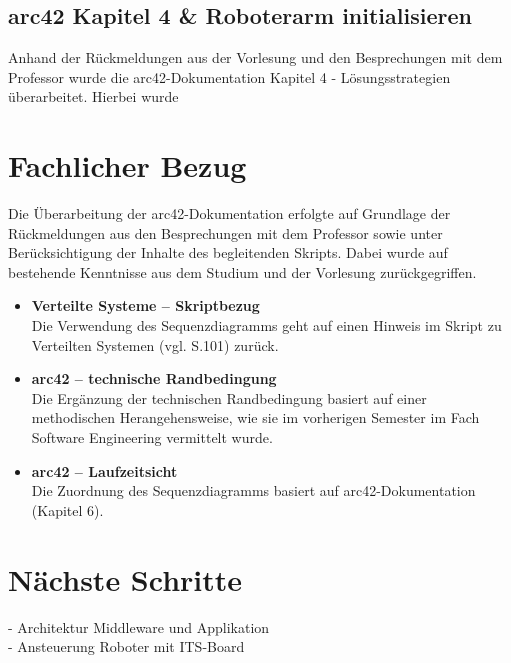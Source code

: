 \documentclass{article}
\begin{document}
\subsection{arc42 Kapitel 4 \& Roboterarm initialisieren} 
Anhand der Rückmeldungen aus der Vorlesung und den Besprechungen mit dem Professor wurde die arc42-Dokumentation Kapitel 4 - Lösungsstrategien überarbeitet.
Hierbei wurde 


\section{Fachlicher Bezug}

Die Überarbeitung der arc42-Dokumentation erfolgte auf Grundlage der Rückmeldungen aus den Besprechungen mit dem Professor sowie unter Berücksichtigung der Inhalte des begleitenden Skripts.  
Dabei wurde auf bestehende Kenntnisse aus dem Studium und der Vorlesung zurückgegriffen.

\begin{itemize}

\item \textbf{Verteilte Systeme – Skriptbezug} \\
Die Verwendung des Sequenzdiagramms geht auf einen Hinweis im Skript zu Verteilten Systemen (vgl. S.101) zurück.
\item \textbf{arc42 – technische Randbedingung} \\
Die Ergänzung der technischen Randbedingung basiert auf einer methodischen Herangehensweise, wie sie im vorherigen Semester im Fach Software Engineering vermittelt wurde.
\item \textbf{arc42 – Laufzeitsicht} \\
Die Zuordnung des Sequenzdiagramms basiert auf arc42-Dokumentation (Kapitel 6).


\end{itemize}

\section{Nächste Schritte}
- Architektur Middleware und Applikation\\
- Ansteuerung Roboter mit ITS-Board
\end{document}
